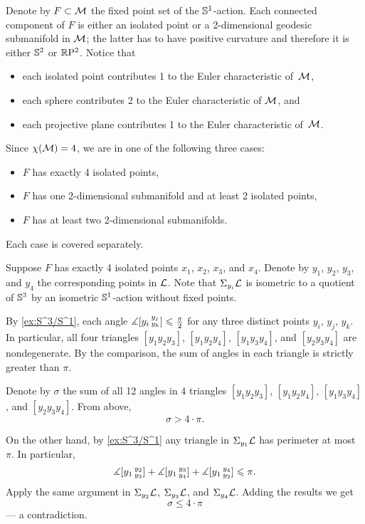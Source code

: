 Denote by $F\subset \mathcal{M}$ the fixed point set of the $\mathbb{S}^1$-action.
Each connected component of $F$ is either an isolated point or a 2-dimensional geodesic submanifold in $\mathcal{M}$;
the latter has to have positive curvature and therefore it is either $\mathbb{S}^2$ or $\mathbb{R}\mathrm{P}^2$.
Notice that 
\begin{itemize}
 \item each isolated point contributes 1 to the Euler characteristic of~$\mathcal{M}$,
 \item each sphere contributes 2 to the Euler characteristic of $\mathcal{M}$, and
 \item each projective plane contributes 1 to the Euler characteristic of~$\mathcal{M}$.
\end{itemize}
Since $\chi(\mathcal{M})=4$, we are in one of the following three cases:
\begin{itemize}
 \item $F$ has exactly 4 isolated points,
 \item $F$ has one 2-dimensional submanifold and at least 2 isolated points,
 \item $F$ has at least two 2-dimensional submanifolds.
\end{itemize}
Each case is covered separately.

Suppose $F$ has exactly 4 isolated points $x_1$, $x_2$, $x_3$, and $x_4$.
Denote by $y_1$, $y_2$, $y_3$, and $y_4$ the corresponding points in $\mathcal{L}$.
Note that $\Sigma_{y_i}\mathcal{L}$ is isometric to a quotient of $\mathbb{S}^3$ by an isometric $\mathbb{S}^1$-action without fixed points.

By \ref{ex:S^3/S^1}, each angle $\measuredangle[y_i\,{}^{y_j}_{y_k}]\leqslant \tfrac\pi2$ for any three distinct points 
$y_i$, $y_j$, $y_k$.
In particular, all four triangles $[y_1y_2y_3]$, $[y_1y_2y_4]$, $[y_1y_3y_4]$, and $[y_2y_3y_4]$ are nondegenerate.
By the comparison, the sum of angles in each triangle is strictly greater than $\pi$.

Denote by $\sigma$ the sum of all 12 angles in 4 triangles $[y_1y_2y_3]$, $[y_1y_2y_4]$, $[y_1y_3y_4]$, and $[y_2y_3y_4]$.
From above,
\[\sigma>4\cdot\pi.\]

On the other hand, by \ref{ex:S^3/S^1} any triangle in $\Sigma_{y_1}\mathcal{L}$ has perimeter at most $\pi$.
In particular, 
\[\measuredangle[y_1\,{}^{y_2}_{y_3}]+\measuredangle[y_1\,{}^{y_3}_{y_4}]+\measuredangle[y_1\,{}^{y_4}_{y_2}]\leqslant \pi.\]
Apply the same argument in $\Sigma_{y_2}\mathcal{L}$, $\Sigma_{y_3}\mathcal{L}$, and $\Sigma_{y_4}\mathcal{L}$.
Adding the results we get 
\[\sigma\le 4\cdot\pi\]
--- a contradiction.

